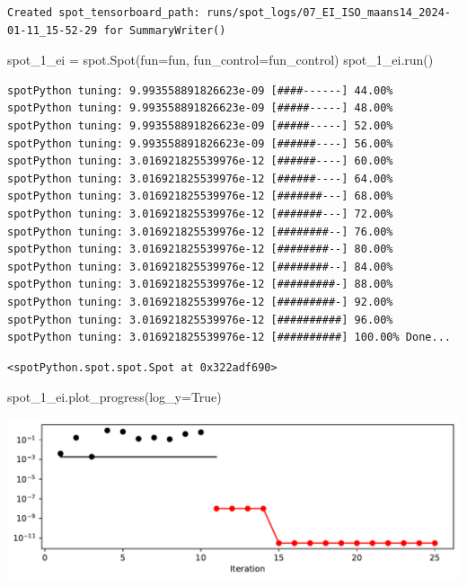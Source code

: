 \documentclass[
  letterpaper,
  DIV=11,
  numbers=noendperiod]{scrreprt}
\newenvironment{Shaded}{\begin{snugshade}}{\end{snugshade}}
\newcommand{\NormalTok}[1]{\textcolor[rgb]{0.00,0.23,0.31}{#1}}
\newcommand{\OperatorTok}[1]{\textcolor[rgb]{0.37,0.37,0.37}{#1}}
\newcommand{\VariableTok}[1]{\textcolor[rgb]{0.07,0.07,0.07}{#1}}
\begin{document}
\begin{verbatim}
Created spot_tensorboard_path: runs/spot_logs/07_EI_ISO_maans14_2024-01-11_15-52-29 for SummaryWriter()
\end{verbatim}

\begin{Shaded}
\begin{Highlighting}[]
\NormalTok{spot\_1\_ei }\OperatorTok{=}\NormalTok{ spot.Spot(fun}\OperatorTok{=}\NormalTok{fun,}
\NormalTok{                     fun\_control}\OperatorTok{=}\NormalTok{fun\_control)}
\NormalTok{spot\_1\_ei.run()}
\end{Highlighting}
\end{Shaded}

\begin{verbatim}
spotPython tuning: 9.993558891826623e-09 [####------] 44.00% 
spotPython tuning: 9.993558891826623e-09 [#####-----] 48.00% 
spotPython tuning: 9.993558891826623e-09 [#####-----] 52.00% 
spotPython tuning: 9.993558891826623e-09 [######----] 56.00% 
spotPython tuning: 3.016921825539976e-12 [######----] 60.00% 
spotPython tuning: 3.016921825539976e-12 [######----] 64.00% 
spotPython tuning: 3.016921825539976e-12 [#######---] 68.00% 
spotPython tuning: 3.016921825539976e-12 [#######---] 72.00% 
spotPython tuning: 3.016921825539976e-12 [########--] 76.00% 
spotPython tuning: 3.016921825539976e-12 [########--] 80.00% 
spotPython tuning: 3.016921825539976e-12 [########--] 84.00% 
spotPython tuning: 3.016921825539976e-12 [#########-] 88.00% 
spotPython tuning: 3.016921825539976e-12 [#########-] 92.00% 
spotPython tuning: 3.016921825539976e-12 [##########] 96.00% 
spotPython tuning: 3.016921825539976e-12 [##########] 100.00% Done...
\end{verbatim}

\begin{verbatim}
<spotPython.spot.spot.Spot at 0x322adf690>
\end{verbatim}

\begin{Shaded}
\begin{Highlighting}[]
\NormalTok{spot\_1\_ei.plot\_progress(log\_y}\OperatorTok{=}\VariableTok{True}\NormalTok{)}
\end{Highlighting}
\end{Shaded}

\includegraphics{012_num_spot_ei_files/figure-pdf/cell-10-output-1.pdf}
\end{document}
